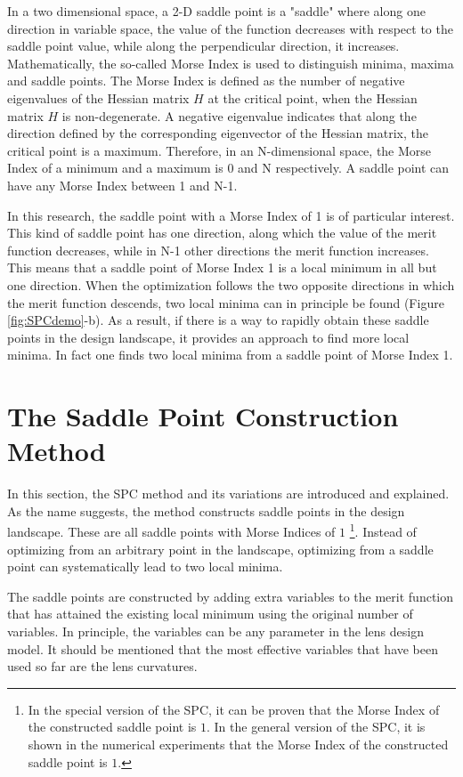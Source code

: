 In a two dimensional space, a 2-D saddle point is a "saddle" where along one direction in variable space, the value of the function decreases with respect to the saddle point value, while along the perpendicular direction, it increases. Mathematically, the so-called Morse Index is used to distinguish minima, maxima and saddle points. The Morse Index is defined as the number of negative eigenvalues of the Hessian matrix \textbf{$H$} at the critical point, when the Hessian matrix \textbf{$H$} is non-degenerate. A negative eigenvalue indicates that along the direction defined by the corresponding eigenvector of the Hessian matrix, the critical point is a maximum. Therefore, in an N-dimensional space, the Morse Index of a minimum and a maximum is 0 and N respectively. A saddle point can have any Morse Index between 1 and N-1. 

In this research, the saddle point with a Morse Index of 1 is of particular interest. This kind of saddle point has one direction, along which the value of the merit function decreases, while in N-1 other directions the merit function increases. This means that a saddle point of Morse Index 1 is a local minimum in all but one direction. When the optimization follows the two opposite directions in which the merit function descends, two local minima can in principle be found (Figure \ref{fig:SPCdemo}-b). As a result, if there is a way to rapidly obtain these saddle points in the design landscape, it provides an approach to find more local minima. In fact one finds two local minima from a saddle point of Morse Index 1. 

\section{The Saddle Point Construction Method}
In this section, the SPC method and its variations are introduced and explained. As the name suggests, the method constructs saddle points in the design landscape. These are all saddle points with Morse Indices of $1$  \footnote{In the special version of the SPC, it can be proven that the Morse Index of the constructed saddle point is $1$. In the general version of the SPC, it is shown in the numerical experiments that the Morse Index of the constructed saddle point is $1$.}. Instead of optimizing from an arbitrary point in the landscape, optimizing from a saddle point can systematically lead to two local minima. 

The saddle points are constructed by adding extra variables to the merit function that has attained the existing local minimum using the original number of variables. In principle, the variables can be any parameter in the lens design model. It should be mentioned that the most effective variables that have been used so far are the lens curvatures. 

